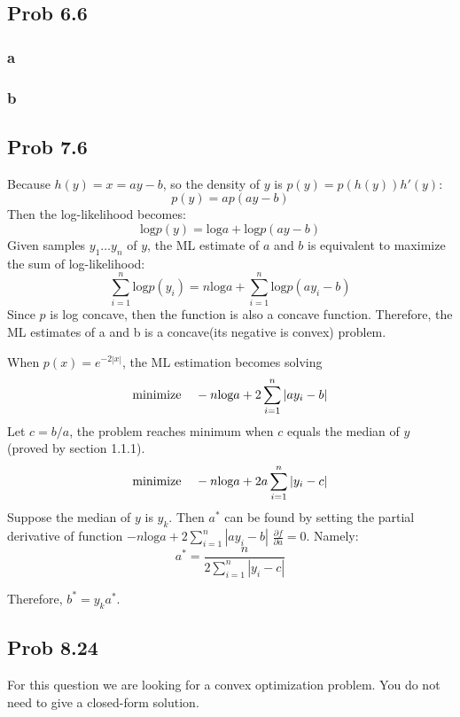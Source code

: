 \message{ !name(ass4_ChangLi.tex)}\documentclass[10pt,a4paper]{article}
\begin{document}
\subsection{Prob 6.6}
\subsubsection{a}


\subsubsection{b}


\subsection{Prob 7.6}

Because $h(y)=x=ay-b$, so the density of $y$ is
$p(y)=p(h(y))h'(y)$:
$$p(y)= ap(ay-b)$$ 
Then the log-likelihood becomes:
$$ \text{log}p(y) = \text{log}a + \text{log}p(ay-b)$$
Given samples $y_1\dots y_n$ of $y$, the ML estimate of $a$
and $b$ is equivalent to maximize the sum of log-likelihood:
$$\sum_{i=1}^{n}\text{log}p(y_i)=n\text{log}a+\sum_{i=1}^{n}\text{log}p(ay_i-b)$$
Since $p$ is log concave, then the function is also a
concave function. Therefore, the ML estimates of a and b is
a concave(its negative is convex) problem.

When $p(x)=e^{-2|x|}$, the ML estimation becomes solving
$$ \text{minimize\;\;\;\;}-n\text{log}a+2\sum_{i=1}^{n}|ay_i-b|$$
Let $c=b/a$, the problem reaches minimum when $c$ equals the
median of $y$ (proved by section 1.1.1). 
$$ \text{minimize\;\;\;\;}-n\text{log}a+2a\sum_{i=1}^{n}|y_i-c|$$
Suppose the median of $y$ is $y_k$. Then $a^*$ can be found
by setting the partial derivative of function
$-n\text{log}a+2\sum_{i=1}^{n}|ay_i-b|$ $\frac{\partial
  f}{\partial a}=0$. Namely: 
$$a^* = \frac{n}{2\sum_{i=1}^{n}|y_i-c|}$$

Therefore, $b^*=y_ka^*$.


\subsection{Prob 8.24}

For this question we are looking for a convex optimization problem. You do not need to give a closed-form solution.


	\renewcommand\refname{Bibliography}
	
	
\end{document}
